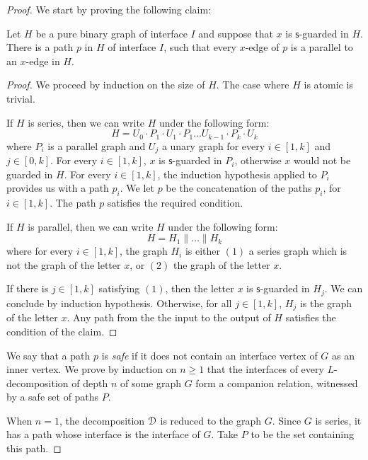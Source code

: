 \begin{proof} We start by proving the following claim:
\begin{claim}\label{new-claim-series}
Let $H$ be a pure binary graph of interface $I$ and suppose that $x$ is $\mathsf{s}$-guarded in $H$. There is a path $p$ in $H$ of interface $I$, such that every  $x$-edge of $p$ is a parallel to an $x$-edge in $H$. 
\end{claim}
\begin{proof}
We proceed by induction on the size of $H$. The case where $H$ is atomic is trivial.

 
If $H$ is series, then we can write $H$ under the following form:
 $$H=U_0\cdot P_1\cdot U_1\cdot P_1\dots U_{k-1}\cdot P_k\cdot U_k$$
  where $P_i$ is a parallel graph and $U_j$ a unary graph for every $i\in[1,k]$ and $j\in[0,k]$.
  For every $i\in[1,k]$, $x$ is $\mathsf{s}$-guarded in $P_i$, otherwise $x$ would not be guarded in $H$. For every $i\in [1,k]$, the induction hypothesis applied to $P_i$ provides us with a path $p_i$. We let $p$ be the concatenation of the paths $p_i$, for $i\in[1,k]$. The path $p$ satisfies the required condition.
\medskip

If $H$ is parallel, then we can write $H$ under the following form:
$$H=H_1\parallel\dots \parallel H_k$$
 where for every $i\in [1,k]$, the graph $H_i$ is either $(1)$ a series graph which is not the graph of the letter $x$, or $(2)$ the graph of the letter $x$.

If there is $j\in[1,k]$ satisfying $(1)$, then the letter $x$ is $\mathsf{s}$-guarded in $H_j$. We can conclude by induction hypothesis. Otherwise, for all $j\in[1,k]$, $H_j$ is the graph of the letter $x$. Any path from the the input to the output of $H$ satisfies the condition of the claim. 
 \end{proof}
 We say that a path $p$ is \emph{safe} if it does not contain an interface vertex of $G$ as an inner vertex. 
 We prove by induction on $n\geq 1$ that the interfaces of every $L$-decomposition  of depth $n$ of some graph $G$ form a companion relation, witnessed by a safe set of paths $P$. 
\medskip

 When $n=1$, the decomposition $\mathcal D$ is reduced to the graph $G$. Since $G$ is series, it has a path whose interface is the interface of $G$. Take $P$ to be the set containing this path. 
\medskip


\end{proof}
